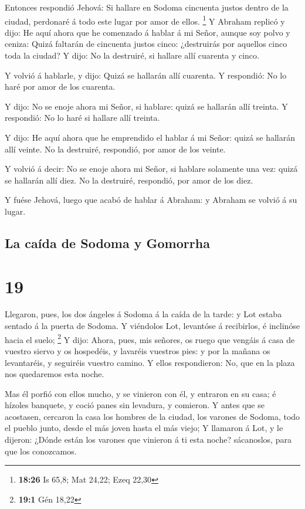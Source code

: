  Entonces respondió Jehová: Si hallare en Sodoma cincuenta
justos dentro de la ciudad, perdonaré á todo este lugar por amor de
ellos. \footnote{\textbf{18:26} Is 65,8; Mat 24,22; Ezeq 22,30}
 Y Abraham replicó y dijo: He aquí ahora que he comenzado á
hablar á mi Señor, aunque soy polvo y ceniza:  Quizá
faltarán de cincuenta justos cinco: ¿destruirás por aquellos cinco toda
la ciudad? Y dijo: No la destruiré, si hallare allí cuarenta y cinco.

 Y volvió á hablarle, y dijo: Quizá se hallarán allí
cuarenta. Y respondió: No lo haré por amor de los cuarenta.

 Y dijo: No se enoje ahora mi Señor, si hablare: quizá se
hallarán allí treinta. Y respondió: No lo haré si hallare allí treinta.

 Y dijo: He aquí ahora que he emprendido el hablar á mi
Señor: quizá se hallarán allí veinte. No la destruiré, respondió, por
amor de los veinte.

 Y volvió á decir: No se enoje ahora mi Señor, si hablare
solamente una vez: quizá se hallarán allí diez. No la destruiré,
respondió, por amor de los diez.

 Y fuése Jehová, luego que acabó de hablar á Abraham: y
Abraham se volvió á su lugar.

\hypertarget{la-cauxedda-de-sodoma-y-gomorrha}{%
\subsection{La caída de Sodoma y
Gomorrha}\label{la-cauxedda-de-sodoma-y-gomorrha}}

\hypertarget{section-18}{%
\section{19}\label{section-18}}

 Llegaron, pues, los dos ángeles á Sodoma á la caída de la
tarde: y Lot estaba sentado á la puerta de Sodoma. Y viéndolos Lot,
levantóse á recibirlos, é inclinóse hacia el suelo; \footnote{\textbf{19:1}
  Gén 18,22}  Y dijo: Ahora, pues, mis señores, os ruego que
vengáis á casa de vuestro siervo y os hospedéis, y lavaréis vuestros
pies: y por la mañana os levantaréis, y seguiréis vuestro camino. Y
ellos respondieron: No, que en la plaza nos quedaremos esta noche.

 Mas él porfió con ellos mucho, y se vinieron con él, y
entraron en su casa; é hízoles banquete, y coció panes sin levadura, y
comieron.  Y antes que se acostasen, cercaron la casa los
hombres de la ciudad, los varones de Sodoma, todo el pueblo junto, desde
el más joven hasta el más viejo;  Y llamaron á Lot, y le
dijeron: ¿Dónde están los varones que vinieron á ti esta noche?
sácanoslos, para que los conozcamos.

